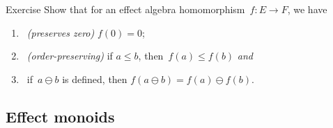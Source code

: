 \documentclass[b]{subfiles}
\begin{document}
\begin{parsec}
\begin{point}{Exercise}%
Show that for an effect algebra homomorphism~$f\colon E \to F$,
    we have
    \begin{enumerate}
        \item~\emph{(preserves zero)} $f(0) = 0$;
        \item~\emph{(order-preserving)} if $a \leq b$, then~$f(a) \leq f(b)$
                        \emph{and}
        \item~if~$a\ominus b$ is defined,
            then $f(a \ominus b) = f(a) \ominus f(b)$.
    \end{enumerate}
\end{point}
\end{parsec}

\subsection{Effect monoids}
\end{document}
